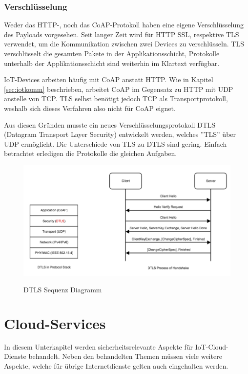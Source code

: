 \subsubsection{Verschlüsselung}
Weder das HTTP-, noch das CoAP-Protokoll haben eine eigene Verschlüsselung des Payloads vorgesehen. Seit langer Zeit wird für HTTP SSL, respektive TLS verwendet, um die Kommunikation zwischen zwei Devices zu verschlüsseln. TLS verschlüsselt die gesamten Pakete in der Applikationsschicht, Protokolle unterhalb der Applikationsschicht sind weiterhin im Klartext verfügbar. 

IoT-Devices arbeiten häufig mit CoAP anstatt HTTP. Wie in Kapitel \ref{sec:iotkomm} beschrieben, arbeitet CoAP im Gegensatz zu HTTP mit UDP anstelle von TCP. TLS selbst benötigt jedoch TCP als Transportprotokoll, weshalb sich dieses Verfahren also nicht für CoAP eignet.

Aus diesen Gründen musste ein neues Verschlüsselungsprotokoll DTLS (Datagram Transport Layer Security) entwickelt werden, welches ''TLS'' über UDP ermöglicht. Die Unterschiede von TLS zu DTLS sind gering. Einfach betrachtet erledigen die Protokolle die gleichen Aufgaben.

\begin{figure}[H]
\centering
\includegraphics[scale=0.5]{../02_Analyse/images/coap_dtls_diagram.png}
\caption{DTLS Sequenz Diagramm} \cite{DTLSDiagram}
\end{figure}
\newpage
\section{Cloud-Services}
In diesem Unterkapitel werden sicherheitsrelevante Aspekte für IoT-Cloud-Dienste behandelt. Neben den behandelten Themen müssen viele weitere Aspekte, welche für übrige Internetdienste gelten auch eingehalten werden.
